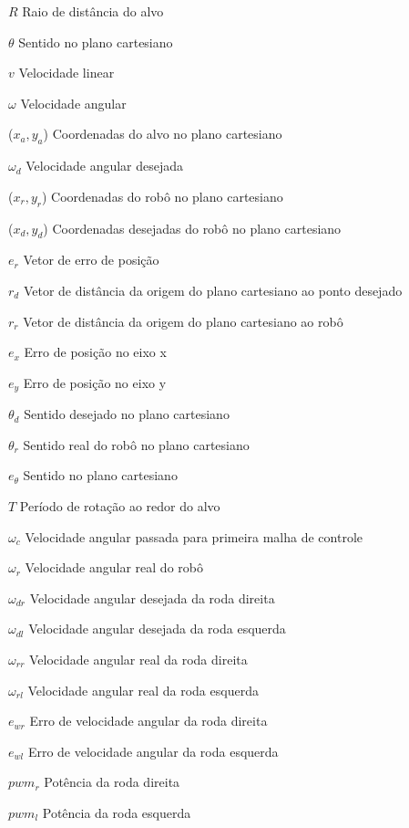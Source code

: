 %
%

\begin{simbolos}
	\item[$R$] Raio de distância do alvo
	\item[$\theta$] Sentido no plano cartesiano
	\item[$v$] Velocidade linear
	\item[$\omega$] Velocidade angular
	\item[($x_{a},y_{a}$)] Coordenadas do alvo no plano cartesiano
	\item[$\omega_{d}$] Velocidade angular desejada
	\item[($x_{r},y_{r}$)] Coordenadas do robô no plano cartesiano
	\item[($x_{d},y_{d}$)] Coordenadas desejadas do robô no plano cartesiano
	\item[$e_{r}$] Vetor de erro de posição
	\item[$r_{d}$] Vetor de distância da origem do plano cartesiano ao ponto desejado
	\item[$r_{r}$] Vetor de distância da origem do plano cartesiano ao robô
	\item[$e_{x}$] Erro de posição no eixo x
	\item[$e_{y}$] Erro de posição no eixo y
	\item[$\theta_{d}$] Sentido desejado no plano cartesiano
	\item[$\theta_{r}$] Sentido real do robô no plano cartesiano
	\item[$e_{\theta}$] Sentido no plano cartesiano
	\item[$T$] Período de rotação ao redor do alvo
	\item[$ \omega _{c} $] Velocidade angular passada para primeira malha de controle
	\item[$ \omega _{r} $] Velocidade angular real do robô
	\item[$ \omega _{dr} $] Velocidade angular desejada da roda direita
	\item[$ \omega _{dl} $] Velocidade angular desejada da roda esquerda
    \item[$ \omega _{rr} $] Velocidade angular real da roda direita
    \item[$ \omega _{rl} $] Velocidade angular real da roda esquerda
    \item[$  e_{wr} $] Erro de velocidade angular da roda direita 
    \item[$  e_{wl} $] Erro de velocidade angular da roda esquerda
    \item[$  pwm_{r} $] Potência da roda direita 
    \item[$  pwm_{l} $] Potência da roda esquerda
\end{simbolos}
